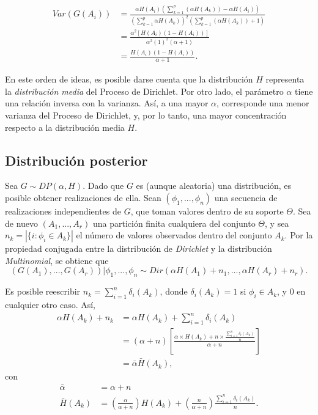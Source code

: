\begin{equation*}
\begin{aligned}
    Var(G(A_i)) 
    &= \frac{\alpha H(A_i)\left(\sum_{k=1}^p(\alpha H(A_k)) - \alpha H(A_i)\right)}
       {\left(\sum_{k=1}^p \alpha H(A_k)\right)^2\left(\sum_{k=1}^p(\alpha H(A_k)) + 1\right)} \\
    &= \frac{\alpha^2 [H(A_i)(1 - H(A_i))]}
       {\alpha^2 (1)^2(\alpha + 1)} \\
    &= \frac{H(A_i)(1 - H(A_i))}
       {\alpha + 1}.
\end{aligned}
\end{equation*}

En este orden de ideas, es posible darse cuenta que la distribuci\'on $H$ representa la \textit{distribuci\'on media} del Proceso de Dirichlet. Por otro lado, el par\'ametro $\alpha$ tiene una relaci\'on inversa con la varianza. As\'i, a una mayor $\alpha$, corresponde una menor varianza del Proceso de Dirichlet, y, por lo tanto, una mayor concentraci\'on respecto a la distribuci\'on media $H$. 

\subsection{Distribuci\'on posterior}

Sea $G \sim DP(\alpha,H)$. Dado que $G$ es (aunque aleatoria) una distribuci\'on, es posible obtener realizaciones de ella. Sean $(\phi_1,..., \phi_n)$ una secuencia de realizaciones independientes de $G$, que toman valores dentro de su soporte $\Theta$. Sea de nuevo $(A_1,...,A_r)$ una partici\'on finita cualquiera del conjunto $\Theta$, y sea $n_k = |\{i: \phi_i \in A_k\}|$ el n\'umero de valores observados dentro del conjunto $A_k$. Por la propiedad conjugada entre la distribuci\'on de \textit{Dirichlet} y la distribuci\'on \textit{Multinomial}, se obtiene que
\begin{equation*}
   (G(A_1),...,G(A_r))|\phi_1,...,\phi_n \sim Dir(\alpha H(A_1) + n_1,...,\alpha H(A_r) + n_r). 
\end{equation*}

Es posible reescribir $n_k = \sum_{i=1}^n \delta_i(A_k)$, donde $\delta_i(A_k) = 1$ si $\phi_i \in A_k$, y $0$ en cualquier otro caso. As\'i,
\begin{equation*}
\begin{aligned}
    \alpha H(A_k) + n_k 
    &= \alpha H(A_k) + \sum_{i=1}^n \delta_i(A_k) \\
    &= (\alpha + n)
    \left[
        \frac{\alpha \times H(A_k) + n \times \frac{\sum_{i=1}^n \delta_i(A_k)}{n}}{\alpha + n}
    \right] \\
    &= \bar{\alpha} \bar{H}(A_k),
\end{aligned}
\end{equation*}
con
\begin{equation*}
\begin{aligned}
    \bar{\alpha} &= \alpha + n \\
    \bar{H}(A_k) &=  
        \left(\frac{\alpha}{\alpha + n}\right)H(A_k) + 
        \left(\frac{n}{\alpha + n}\right)\frac{\sum_{i=1}^n \delta_i(A_k)}{n}.
\end{aligned}
\end{equation*}

